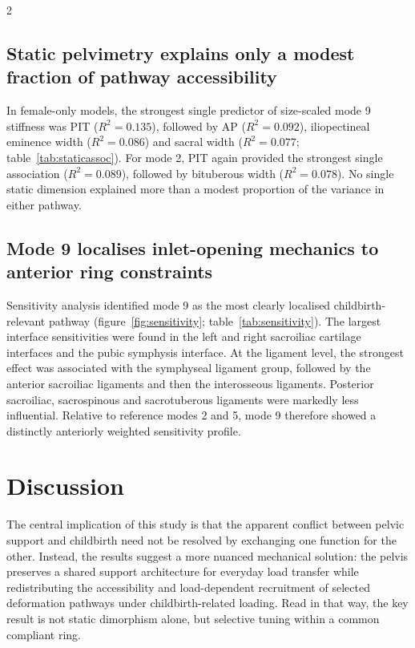 \documentclass[openacc]{rsproca_new}
\begin{document}
\begin{multicols}{2}
\subsection{Static pelvimetry explains only a modest fraction of pathway accessibility}

In female-only models, the strongest single predictor of size-scaled mode 9 stiffness was PIT ($R^2 = 0.135$), followed by AP ($R^2 = 0.092$), iliopectineal eminence width ($R^2 = 0.086$) and sacral width ($R^2 = 0.077$; table~\ref{tab:staticassoc}). For mode 2, PIT again provided the strongest single association ($R^2 = 0.089$), followed by bituberous width ($R^2 = 0.078$). No single static dimension explained more than a modest proportion of the variance in either pathway.

\subsection{Mode 9 localises inlet-opening mechanics to anterior ring constraints}

Sensitivity analysis identified mode 9 as the most clearly localised childbirth-relevant pathway (figure~\ref{fig:sensitivity}; table~\ref{tab:sensitivity}). The largest interface sensitivities were found in the left and right sacroiliac cartilage interfaces and the pubic symphysis interface. At the ligament level, the strongest effect was associated with the symphyseal ligament group, followed by the anterior sacroiliac ligaments and then the interosseous ligaments. Posterior sacroiliac, sacrospinous and sacrotuberous ligaments were markedly less influential. Relative to reference modes 2 and 5, mode 9 therefore showed a distinctly anteriorly weighted sensitivity profile.

\section{Discussion}

The central implication of this study is that the apparent conflict between pelvic support and childbirth need not be resolved by exchanging one function for the other. Instead, the results suggest a more nuanced mechanical solution: the pelvis preserves a shared support architecture for everyday load transfer while redistributing the accessibility and load-dependent recruitment of selected deformation pathways under childbirth-related loading. Read in that way, the key result is not static dimorphism alone, but selective tuning within a common compliant ring.


\end{multicols}
\end{document}
